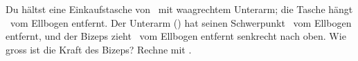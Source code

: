 Du hältst eine Einkaufstasche von \mTO\ mit waagrechtem Unterarm; die Tasche hängt \aTO\ vom Ellbogen entfernt. Der Unterarm (\mUO) hat seinen Schwerpunkt \cAO\ vom Ellbogen entfernt, und der Bizeps zieht \dMO\ vom Ellbogen entfernt senkrecht nach oben. Wie gross ist die Kraft des Bizeps? Rechne mit \gO.

